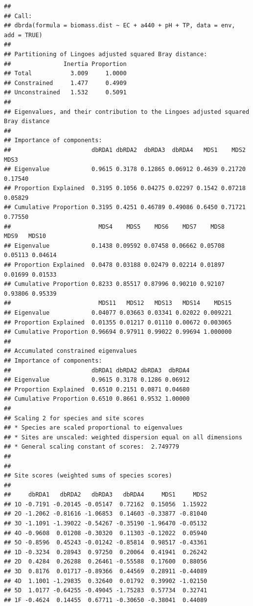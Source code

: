 \documentclass[
]{book}
\begin{document}
\begin{verbatim}
## 
## Call:
## dbrda(formula = biomass.dist ~ EC + a440 + pH + TP, data = env,      add = TRUE) 
## 
## Partitioning of Lingoes adjusted squared Bray distance:
##               Inertia Proportion
## Total           3.009     1.0000
## Constrained     1.477     0.4909
## Unconstrained   1.532     0.5091
## 
## Eigenvalues, and their contribution to the Lingoes adjusted squared Bray distance 
## 
## Importance of components:
##                       dbRDA1 dbRDA2  dbRDA3  dbRDA4   MDS1    MDS2    MDS3
## Eigenvalue            0.9615 0.3178 0.12865 0.06912 0.4639 0.21720 0.17540
## Proportion Explained  0.3195 0.1056 0.04275 0.02297 0.1542 0.07218 0.05829
## Cumulative Proportion 0.3195 0.4251 0.46789 0.49086 0.6450 0.71721 0.77550
##                         MDS4    MDS5    MDS6    MDS7    MDS8    MDS9   MDS10
## Eigenvalue            0.1438 0.09592 0.07458 0.06662 0.05708 0.05113 0.04614
## Proportion Explained  0.0478 0.03188 0.02479 0.02214 0.01897 0.01699 0.01533
## Cumulative Proportion 0.8233 0.85517 0.87996 0.90210 0.92107 0.93806 0.95339
##                         MDS11   MDS12   MDS13   MDS14    MDS15
## Eigenvalue            0.04077 0.03663 0.03341 0.02022 0.009221
## Proportion Explained  0.01355 0.01217 0.01110 0.00672 0.003065
## Cumulative Proportion 0.96694 0.97911 0.99022 0.99694 1.000000
## 
## Accumulated constrained eigenvalues
## Importance of components:
##                       dbRDA1 dbRDA2 dbRDA3  dbRDA4
## Eigenvalue            0.9615 0.3178 0.1286 0.06912
## Proportion Explained  0.6510 0.2151 0.0871 0.04680
## Cumulative Proportion 0.6510 0.8661 0.9532 1.00000
## 
## Scaling 2 for species and site scores
## * Species are scaled proportional to eigenvalues
## * Sites are unscaled: weighted dispersion equal on all dimensions
## * General scaling constant of scores:  2.749779 
## 
## 
## Site scores (weighted sums of species scores)
## 
##     dbRDA1   dbRDA2   dbRDA3   dbRDA4     MDS1     MDS2
## 1O -0.7191 -0.20145 -0.05147  0.72162  0.15056  1.15922
## 2O -1.2062 -0.81616 -1.06853  0.14603 -0.33877 -0.81040
## 3O -1.1091 -1.39022 -0.54267 -0.35190 -1.96470 -0.05132
## 4O -0.9608  0.01208 -0.30320  0.11303 -0.12022  0.05940
## 5O -0.8596  0.45243 -0.01242 -0.85814  0.98517 -0.43361
## 1D -0.3234  0.28943  0.97250  0.20064  0.41941  0.26242
## 2D  0.4284  0.26288  0.26461 -0.55588  0.17600  0.88056
## 3D  0.8176  0.01717 -0.89366  0.44569  0.28911 -0.44089
## 4D  1.1001 -1.29835  0.32640  0.01792  0.39902 -1.02150
## 5D  1.0177 -0.64255 -0.49045 -1.75283  0.57734  0.32741
## 1F -0.4624  0.14455  0.67711 -0.30650 -0.38041  0.44089

\end{verbatim}
\end{document}
